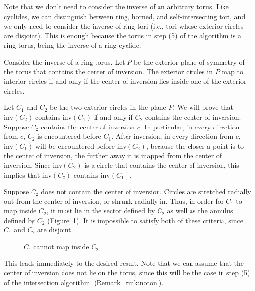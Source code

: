 Note that we don't need to consider the inverse of an arbitrary torus.
Like cyclides, we can distinguish between ring, horned, and self-intersecting
tori, and we only need to consider the inverse of ring tori 
(i.e., tori whose exterior circles are disjoint).
This is enough because 
the torus in step (5) of the algorithm is a ring torus,
being the inverse of a ring cyclide.

\begin{lemma}
\label{lem:intorext}
Consider the inverse of a ring torus.
Let $P$ be the exterior plane of symmetry of the torus that contains
the center of inversion.
The exterior circles in $P$ map to interior circles if and only if the
center of inversion lies inside one of the exterior circles.
\end{lemma}
\prf
Let $C_1$ and $C_2$ be the two exterior circles in the plane $P$.
We will prove that $\mbox{inv}(C_2)$ contains $\mbox{inv}(C_1)$ 
if and only if $C_2$ contains the center of inversion.
Suppose $C_2$ contains the center of inversion $c$.
In particular, in every direction from $c$, $C_2$ is encountered before $C_1$.
After inversion, in every direction from $c$,
$\mbox{inv}(C_1)$ will be encountered before $\mbox{inv}(C_2)$,
because the closer a point is to the center of inversion, 
the further away it is mapped from the center of inversion.
Since $\mbox{inv}(C_2)$ is a circle that contains the center of inversion,
this implies that $\mbox{inv}(C_2)$ contains $\mbox{inv}(C_1)$.

Suppose $C_2$ does not contain the center of inversion.
Circles are stretched radially out from the center of inversion,
or shrunk radially in.
Thus, in order for $C_1$ to map inside $C_2$, it must lie in the sector
defined by $C_2$ as well as the annulus defined by $C_2$ 
(Figure~\ref{fig:cant}).
It is impossible to satisfy both of these criteria,
since $C_1$ and $C_2$ are disjoint.
\QED


\begin{figure}
\vspace{2.5in}
\caption{$C_1$ cannot map inside $C_2$}
\label{fig:cant}
\end{figure}

This leads immediately to the desired result.
Note that we can assume that the center of inversion does not lie on the torus,
since this will be the case in step (5) of the intersection algorithm.
(Remark~\ref{rmk:noton}).

